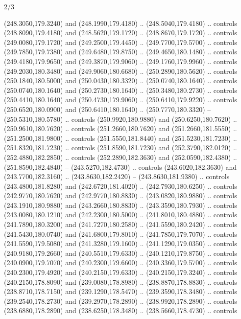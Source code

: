 \begin{flagdescription}{2/3}
\begin{scope}[xshift=0.5\flaglength,yshift=0.5\flagwidth,scale=\flagwidth/259.2]
\begin{scope}[y=0.8pt, x=0.8pt, yscale=-1,shift={(-243,-162)}]
      (248.3050,179.3240) and (248.1990,179.4180) .. (248.5040,179.4180) .. controls
      (248.8090,179.4180) and (248.5620,179.1720) .. (248.8670,179.1720) .. controls
      (249.0080,179.1720) and (249.2500,179.4450) .. (249.7700,179.5700) .. controls
      (249.7850,179.7380) and (249.6480,179.8750) .. (249.4650,180.1480) .. controls
      (249.4180,179.9650) and (249.3870,179.9060) .. (249.1760,179.9960) .. controls
      (249.2030,180.3480) and (249.9060,180.6680) .. (250.2890,180.5620) .. controls
      (250.1840,180.5000) and (250.0430,180.3320) .. (250.0740,180.1640) .. controls
      (250.0740,180.1640) and (250.2730,180.1640) .. (250.3480,180.2730) .. controls
      (250.4410,180.1640) and (250.4730,179.9060) .. (250.6410,179.9220) .. controls
      (250.6520,180.0900) and (250.6410,180.1640) .. (250.7770,180.3320) --
      (250.5310,180.5780) .. controls (250.9920,180.9880) and (250.6250,180.7620) ..
      (250.9610,180.7620) .. controls (251.2660,180.7620) and (251.2660,181.5550) ..
      (251.2500,181.9800) .. controls (251.5550,181.8440) and (251.5230,181.7230) ..
      (251.8320,181.7230) .. controls (251.8590,181.7230) and (252.3790,182.0120) ..
      (252.4880,182.2850) .. controls (252.2890,182.3630) and (252.0590,182.4380) ..
      (251.8590,182.4840) -- (243.5270,182.4730) .. controls (243.6020,182.3630) and
      (243.7700,182.3160) .. (243.8630,182.2420) -- (243.8630,181.9380) .. controls
      (243.4800,181.8280) and (242.6720,181.4020) .. (242.7930,180.6250) .. controls
      (242.9770,180.7620) and (242.9770,180.8830) .. (243.0820,180.9880) .. controls
      (243.1910,180.9880) and (243.2660,180.8830) .. (243.3590,180.7930) .. controls
      (243.0080,180.1210) and (242.2300,180.5000) .. (241.8010,180.4880) .. controls
      (241.7890,180.3200) and (241.7270,180.2580) .. (241.5590,180.2420) .. controls
      (241.5430,180.0740) and (241.6800,179.8010) .. (241.7850,179.7070) .. controls
      (241.5590,179.5080) and (241.3280,179.1600) .. (241.1290,179.0350) .. controls
      (240.9180,179.2660) and (240.5510,179.6330) .. (240.1210,179.8750) .. controls
      (240.0900,179.7070) and (240.2300,179.6600) .. (240.3360,179.5700) .. controls
      (240.2300,179.4920) and (240.2150,179.6330) .. (240.2150,179.3240) .. controls
      (240.2150,178.8090) and (239.0080,178.8980) .. (238.8870,178.8830) .. controls
      (238.8710,178.7150) and (239.1290,178.5470) .. (239.3590,178.3480) .. controls
      (239.2540,178.2730) and (239.2970,178.2890) .. (238.9920,178.2890) .. controls
      (238.6880,178.2890) and (238.6250,178.3480) .. (238.5660,178.4730) .. controls

\end{scope}
\end{scope}
\end{flagdescription}
